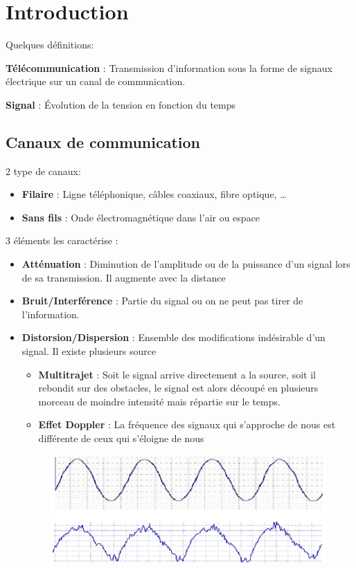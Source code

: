 \section{Introduction}
Quelques définitions:

\textbf{Télécommunication} : Transmission d'information sous la forme de signaux électrique sur un canal de communication.

\textbf{Signal} : Évolution de la tension en fonction du temps

	\subsection{Canaux de communication}
		2 type de canaux:
		\begin{itemize}
			\item \textbf{Filaire} : Ligne téléphonique, câbles coaxiaux, fibre optique, \dots
			\item \textbf{Sans fils} : Onde électromagnétique dans l'air ou espace
		\end{itemize}
		
		3 éléments les caractérise :
		\begin{itemize}
			\item \textbf{Atténuation} : Diminution de l'amplitude ou de la puissance d'un signal lors de sa transmission. Il augmente avec la distance
			\item \textbf{Bruit/Interférence} : Partie du signal ou on ne peut pas tirer de l'information.
			\item  \textbf{Distorsion/Dispersion} : Ensemble des modifications indésirable d'un signal. Il existe plusieurs source
			\begin{itemize}
				\item \textbf{Multitrajet} : Soit le signal arrive directement a la source, soit il rebondit sur des obstacles, le signal est alors découpé en plusieurs morceau de moindre intensité mais répartie sur le temps.
				\item \textbf{Effet Doppler} : La fréquence des signaux qui s'approche de nous est  différente de ceux qui s'éloigne de nous
			\end{itemize}
			
			\begin{figure}[H]
				\centering
				\includegraphics[width=\textwidth]{img/Distortion.png}
			\end{figure}
		\end{itemize}
	
